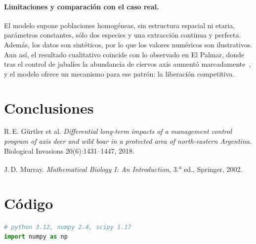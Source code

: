 \documentclass[11pt,a4paper]{article}
\newif\ifguias
\newcommand{\guia}[1]{\ifguias\par\noindent
  {\color{gray!85!black}\small\itshape #1}\par\medskip\fi}
\begin{document}
\paragraph{Limitaciones y comparación con el caso real.}
El modelo supone poblaciones homogéneas, sin estructura espacial ni etaria,
parámetros constantes, sólo dos especies y una extracción continua y
perfecta. Además, los datos son sintéticos, por lo que los valores numéricos
son ilustrativos. Aun así, el resultado cualitativo coincide con lo
observado en El Palmar, donde tras el control de jabalíes la abundancia de
ciervos axis aumentó marcadamente~\cite{gurtler2018}, y el modelo ofrece un
mecanismo para ese patrón: la liberación competitiva.
\section{Conclusiones}
\label{sec:conclusiones}

\guia{Entre tres y cinco afirmaciones cerradas, cada una respaldada por
un resultado propio del trabajo, y una línea sobre qué quedaría por
hacer. No se introduce información nueva ni se repite el resumen palabra
por palabra.}

\guia{Bibliografía: formato consistente en todas las entradas ---
autores, título, revista, volumen, páginas, año. Se citan las fuentes
efectivamente consultadas.}

\begin{thebibliography}{9}
\small

 R.\,E. Gürtler et al.
  \emph{Differential long-term impacts of a management control program of
  axis deer and wild boar in a protected area of north-eastern
  Argentina}. Biological Invasions 20(6):1431--1447, 2018.

 J.\,D. Murray. \emph{Mathematical Biology I: An
  Introduction}, 3.\textsuperscript{a} ed., Springer, 2002.

\end{thebibliography}

\appendix
\section{Código}
\label{ap:codigo}

\guia{El código mínimo que reproduce las figuras, o el enlace al
repositorio y el commit exacto. Indicar versión de Python y de las
bibliotecas usadas, y la semilla del generador aleatorio.}

\begin{lstlisting}[language=Python]
# python 3.12, numpy 2.4, scipy 1.17
import numpy as np
\end{lstlisting}
\end{document}
